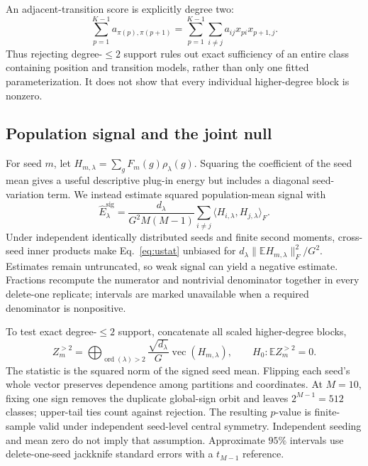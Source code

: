 \documentclass{article}
\newcommand{\Esig}{\widehat E^{\mathrm{sig}}}
\begin{document}
An adjacent-transition score is explicitly degree two:
\begin{equation}
  \sum_{p=1}^{K-1}a_{\pi(p),\pi(p+1)}
  =\sum_{p=1}^{K-1}\sum_{i\ne j}a_{ij}x_{pi}x_{p+1,j}.
  \label{eq:transition}
\end{equation}
Thus rejecting degree-$\leq2$ support rules out exact sufficiency of an entire class containing position and transition models, rather than only one fitted parameterization. It does not show that every individual higher-degree block is nonzero.

\subsection{Population signal and the joint null}

For seed $m$, let $H_{m,\lambda}=\sum_gF_m(g)\rho_\lambda(g)$. Squaring the coefficient of the seed mean gives a useful descriptive plug-in energy but includes a diagonal seed-variation term. We instead estimate squared population-mean signal with
\begin{equation}
  \Esig_\lambda=
  \frac{d_\lambda}{G^2M(M-1)}
  \sum_{i\ne j}\langle H_{i,\lambda},H_{j,\lambda}\rangle_F.
  \label{eq:ustat}
\end{equation}
Under independent identically distributed seeds and finite second moments, cross-seed inner products make Eq.~\eqref{eq:ustat} unbiased for $d_\lambda\lVert\mathbb EH_{m,\lambda}\rVert_F^2/G^2$. Estimates remain untruncated, so weak signal can yield a negative estimate. Fractions recompute the numerator and nontrivial denominator together in every delete-one replicate; intervals are marked unavailable when a required denominator is nonpositive.

To test exact degree-$\leq2$ support, concatenate all scaled higher-degree blocks,
\begin{equation}
  Z_m^{>2}=\bigoplus_{\operatorname{ord}(\lambda)>2}
  \frac{\sqrt{d_\lambda}}{G}\operatorname{vec}(H_{m,\lambda}),
  \qquad H_0:\mathbb EZ_m^{>2}=0.
  \label{eq:jointnull}
\end{equation}
The statistic is the squared norm of the signed seed mean. Flipping each seed's whole vector preserves dependence among partitions and coordinates. At $M=10$, fixing one sign removes the duplicate global-sign orbit and leaves $2^{M-1}=512$ classes; upper-tail ties count against rejection. The resulting $p$-value is finite-sample valid under independent seed-level central symmetry. Independent seeding and mean zero do not imply that assumption. Approximate $95\%$ intervals use delete-one-seed jackknife standard errors with a $t_{M-1}$ reference.
\end{document}

